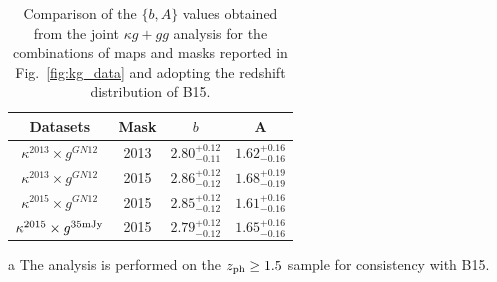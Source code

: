 \begin{table}[t]
\centering
\begin{threeparttable}
\begin{tabular}{cccc}
\toprule
\midrule
Datasets & Mask &  $b$ & A\\
\midrule
$\kappa^{2013} \times  g^{GN12}$ & 2013  & $2.80^{+0.12}_{-0.11}$ & $1.62^{+0.16}_{-0.16}$ \\
$\kappa^{2013} \times  g^{GN12}$ & 2015  & $2.86^{+0.12}_{-0.12}$ & $1.68^{+0.19}_{-0.19}$ \\
$\kappa^{2015} \times g^{GN12}$ & 2015  & $2.85^{+0.12}_{-0.12}$ & $1.61^{+0.16}_{-0.16}$ \\
$\kappa^{2015} \times g^{35\rm{mJy}}$ & 2015  &$2.79^{+0.12}_{-0.12}$ & $1.65^{+0.16}_{-0.16}$ \\
\bottomrule
\end{tabular}
\begin{tablenotes}
\item[a] The analysis is performed on the $z_{\rm{ph}} \ge 1.5$ sample for consistency with B15.
\end{tablenotes}
\end{threeparttable}
\caption{Comparison of the $\{b,A\}$ values obtained from the joint $\kappa g + gg$ analysis for the combinations of maps and masks reported in Fig.~\eqref{fig:kg_data} and adopting the redshift distribution of B15.\label{b_A_maps_masks_old}}
\end{table}


